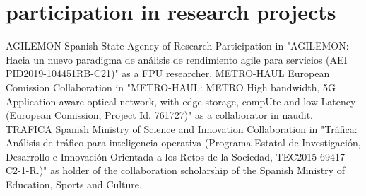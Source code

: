 \documentclass[]{friggeri-cv}
\begin{document}
\section{participation in research projects}
\vspace{-1em}
\begin{entrylist}
{AGILEMON}
{Spanish State Agency of Research}
{Participation in "AGILEMON: Hacia un nuevo paradigma de análisis de rendimiento agile para servicios (AEI PID2019-104451RB-C21)" as a FPU researcher.
}
{METRO-HAUL}
{European Comission}
{Collaboration in "METRO-HAUL: METRO High bandwidth, 5G Application-aware optical network, with edge storage, compUte and low Latency (European Comission, Project Id. 761727)" as a collaborator in naudit.
}
{TRAFICA}
{Spanish Ministry of Science and Innovation}
{Collaboration in  "Tráfica: Análisis de tráfico para inteligencia operativa (Programa Estatal de Investigación, Desarrollo e Innovación Orientada a los Retos de la Sociedad, TEC2015-69417-C2-1-R.)" as holder of the collaboration scholarship of the Spanish Ministry of Education, Sports and Culture.
}
\end{entrylist}
\vspace{-2em}
\end{document}
